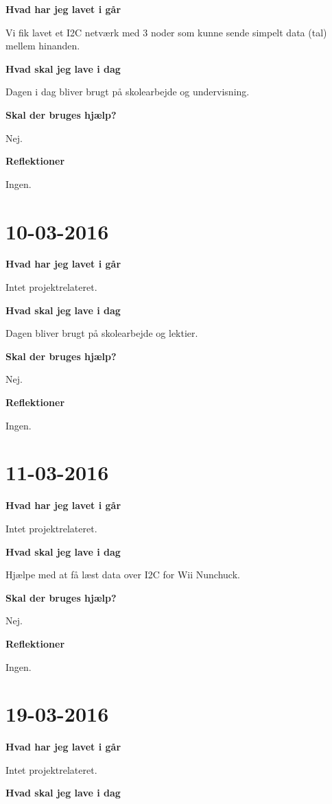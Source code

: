 \documentclass{article}
\begin{document}
	\textbf{Hvad har jeg lavet i går}
	
	Vi fik lavet et I2C netværk med 3 noder som kunne sende simpelt data (tal) mellem hinanden.
	
	\textbf{Hvad skal jeg lave i dag}
	
	Dagen i dag bliver brugt på skolearbejde og undervisning.
	
	\textbf{Skal der bruges hjælp?}
	
	Nej.
	
	\textbf{Reflektioner}
	
	Ingen.

	\section{10-03-2016}
	
	\textbf{Hvad har jeg lavet i går}
	
	Intet projektrelateret.
	
	\textbf{Hvad skal jeg lave i dag}
	
	Dagen bliver brugt på skolearbejde og lektier.
	
	\textbf{Skal der bruges hjælp?}
	
	Nej.
	
	\textbf{Reflektioner}
	
	Ingen.

	\section{11-03-2016}
	
	\textbf{Hvad har jeg lavet i går}
	
	Intet projektrelateret.
	
	\textbf{Hvad skal jeg lave i dag}
	
	Hjælpe med at få læst data over I2C for Wii Nunchuck.
	
	\textbf{Skal der bruges hjælp?}
	
	Nej.
	
	\textbf{Reflektioner}
	
	Ingen.
	
	\section{19-03-2016}
	
	\textbf{Hvad har jeg lavet i går}
	
	Intet projektrelateret.
	
	\textbf{Hvad skal jeg lave i dag}
	
\end{document}
